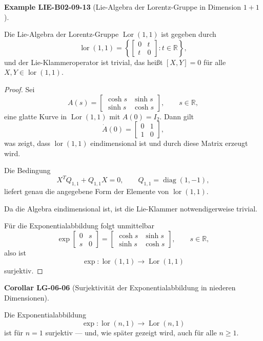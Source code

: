 \documentclass[10pt, letterpaper]{article}
\newcommand{\CustomHeading}[3]{%
  \par\medskip\noindent%
  \textbf{#1 #2} \textnormal{(#3)}.\enskip%
}
\newenvironment{KORO}[2]{\begin{unitbox}\CustomHeading{Corollar}{#1}{#2}}{\end{unitbox}}
\newenvironment{EXA}[2]{\begin{unitbox}\CustomHeading{Example}{#1}{#2}}{\end{unitbox}}
\begin{document}
\begin{EXA}{LIE-B02-09-13}{Lie-Algebra der Lorentz-Gruppe in Dimension \(1+1\)}
Die Lie-Algebra der Lorentz-Gruppe \(\operatorname{Lor}(1,1)\) ist gegeben durch
\[
\operatorname{lor}(1,1)
=\left\{
\begin{bmatrix}
0 & t\\[2pt]
t & 0
\end{bmatrix}
: t\in\mathbb{R}
\right\},
\]
und der Lie-Klammeroperator ist trivial, das heißt
\([X,Y]=0\) für alle \(X,Y\in\operatorname{lor}(1,1)\).

\begin{proof}
Sei
\[
A(s)=
\begin{bmatrix}
\cosh s & \sinh s\\[2pt]
\sinh s & \cosh s
\end{bmatrix},
\qquad s\in\mathbb{R},
\]
eine glatte Kurve in \(\operatorname{Lor}(1,1)\) mit \(A(0)=I_2\).
Dann gilt
\[
\dot A(0)=
\begin{bmatrix}
0 & 1\\[2pt]
1 & 0
\end{bmatrix},
\]
was zeigt, dass \(\operatorname{lor}(1,1)\) eindimensional ist und durch diese Matrix erzeugt wird.

Die Bedingung
\[
X^{T}Q_{1,1}+Q_{1,1}X=0, 
\qquad Q_{1,1}=\operatorname{diag}(1,-1),
\]
liefert genau die angegebene Form der Elemente von \(\operatorname{lor}(1,1)\).

Da die Algebra eindimensional ist, ist die Lie-Klammer notwendigerweise trivial.

Für die Exponentialabbildung folgt unmittelbar
\[
\exp
\begin{bmatrix}
0 & s\\[2pt]
s & 0
\end{bmatrix}
=
\begin{bmatrix}
\cosh s & \sinh s\\[2pt]
\sinh s & \cosh s
\end{bmatrix},
\qquad s\in\mathbb{R},
\]
also ist
\[
\exp:\operatorname{lor}(1,1)\longrightarrow\operatorname{Lor}(1,1)
\]
surjektiv.
\end{proof}
\end{EXA}


\begin{KORO}{LG-06-06}{Surjektivität der Exponentialabbildung in niederen Dimensionen}
Die Exponentialabbildung
\[
\exp:\operatorname{lor}(n,1)\longrightarrow\operatorname{Lor}(n,1)
\]
ist für \(n=1\) surjektiv — und, wie später gezeigt wird, auch für alle \(n\geq 1\).
\end{KORO}
\end{document}
